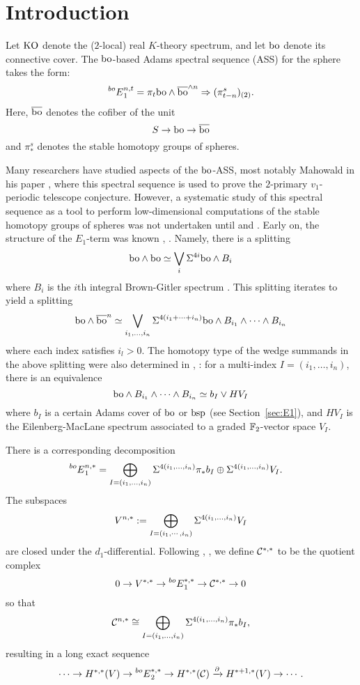 
\section{Introduction}\label{sec:intro}

Let $\mathrm{KO}$ denote the ($2$-local) real $K$-theory spectrum, and let $\mathrm{bo}$ denote its connective cover. The $\mathrm{bo}$-based Adams
spectral sequence (ASS) for the sphere takes the form: 
$$ \prescript{bo}{}{E}_1^{n,t} = \pi_t \mathrm{bo} \wedge \overline{\mathrm{bo}}^{\wedge n} \Rightarrow (\pi^{s}_{t-n})_{(2)}. $$ 
Here, $\overline{\mathrm{bo}}$ denotes the cofiber of the unit 
$$ S \rightarrow \mathrm{bo} \rightarrow \overline{\mathrm{bo}} $$
and $\pi_*^s$ denotes the stable homotopy groups of spheres.

Many researchers have studied aspects of the $\mathrm{bo}$-ASS, most notably Mahowald in his paper \cite{Mahowaldbo}, where this
spectral sequence is used to prove the $2$-primary $v_1$-periodic telescope conjecture. However, a systematic study of this
spectral sequence as a tool to perform low-dimensional computations of the stable homotopy groups of spheres was not
undertaken until \cite{LM} and \cite{Davisbo}. Early on, the structure of the $E_1$-term was known \cite{Mahowaldbo}, \cite{Milgram}. Namely,
there is a splitting $$ \mathrm{bo} \wedge \mathrm{bo} \simeq \bigvee_i \Sigma^{4i} \mathrm{bo} \wedge B_i $$ where $B_i$ is the $i$th integral
Brown-Gitler spectrum \cite{CDGM}. This splitting iterates to yield a splitting 
$$ \mathrm{bo} \wedge \overline{\mathrm{bo}}^n \simeq \bigvee_{i_1, \ldots, i_n}\Sigma^{4(i_1+ \cdots + i_n)} \mathrm{bo} \wedge B_{i_1} \wedge \cdots \wedge B_{i_n} $$
where each index satisfies $i_l > 0$.
The homotopy type of the wedge summands in the above splitting were also determined in \cite{Mahowaldbo}, \cite{Milgram}: for a multi-index $I = (i_1, \ldots, i_n)$, there is an equivalence
$$ \mathrm{bo} \wedge B_{i_1} \wedge \cdots \wedge B_{i_n} \simeq b_I \vee HV_I $$
where $b_I$ is a certain Adams cover of $\mathrm{bo}$ or $\mathrm{bsp}$ (see Section~\ref{sec:E1}), and $HV_I$ is the Eilenberg-MacLane spectrum associated to a graded $\mathbb{F}_2$-vector space $V_I$.

There is a corresponding decomposition
\begin{align*}
\prescript{bo}{}{E}_1^{n,*} & = \bigoplus_{I= (i_1, \ldots, i_n)} \Sigma^{4(i_1, \ldots, i_n)} \pi_*  b_I \oplus \Sigma^{4(i_1, \ldots, i_n)}  V_I.
\end{align*}
The subspaces
$$ V^{n,*} := \bigoplus_{I=( i_1, \cdots ,i_n)} \Sigma^{4(i_1, \ldots, i_n)} V_I $$
are closed under the $d_1$-differential.  Following \cite{LM}, \cite{Davisbo}, we define $\mathcal{C^{*,*}}$ to be the quotient complex
$$ 0 \rightarrow V^{*,*} \rightarrow \prescript{bo}{}{E}_1^{*,*} \rightarrow \mathcal{C}^{*,*} \rightarrow 0 $$
so that
$$ \mathcal{C}^{n,*} \cong \bigoplus_{I= (i_1, \ldots, i_n)} \Sigma^{4(i_1, \ldots, i_n)}  \pi_*  b_I, $$
resulting in a long exact sequence
\begin{equation}\label{eq:LES}
\cdots \rightarrow H^{*,*}(V) \rightarrow \prescript{bo}{}{E}_2^{*,*} \rightarrow H^{*,*}(\mathcal{C}) \xrightarrow{\partial} H^{*+1, *}(V) \rightarrow \cdots.
\end{equation}

